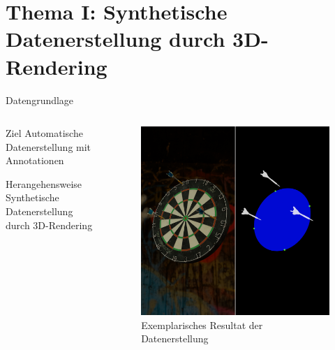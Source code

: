 \section{Thema I: Synthetische Datenerstellung durch 3D-Rendering}

\begin{frame}{Datengrundlage}
    \begin{columns}
        \begin{column}{0.6\linewidth}

            \begin{block}{Ziel}
                Automatische Datenerstellung mit Annotationen
            \end{block}

            \begin{block}{Herangehensweise}
                Synthetische Datenerstellung durch 3D-Rendering
            \end{block}

        \end{column}
        \begin{column}{0.4\linewidth}

            \begin{figure}
                \centering
                \includegraphics[height=0.65\textheight]{imgs/datagen.png}
                \caption{Exemplarisches Resultat der Datenerstellung}
            \end{figure}

        \end{column}
    \end{columns}
\end{frame}

